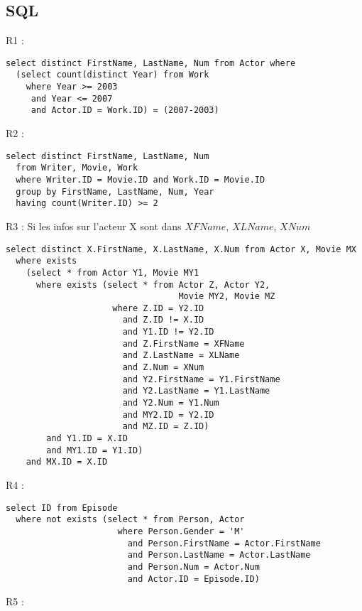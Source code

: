 \documentclass[a4paper,12pt]{article}
\begin{document}
\subsection{SQL}
\begin{list}{-}{}
  \item R1 :
    \begin{lstlisting}
select distinct FirstName, LastName, Num from Actor where
  (select count(distinct Year) from Work
    where Year >= 2003
     and Year <= 2007
     and Actor.ID = Work.ID) = (2007-2003)
    \end{lstlisting}
  \item R2 :
    \begin{lstlisting}
select distinct FirstName, LastName, Num
  from Writer, Movie, Work
  where Writer.ID = Movie.ID and Work.ID = Movie.ID
  group by FirstName, LastName, Num, Year
  having count(Writer.ID) >= 2
    \end{lstlisting}
  \item R3 :
    Si les infos sur l'acteur X sont dans $XFName$, $XLName$, $XNum$
    \begin{lstlisting}
select distinct X.FirstName, X.LastName, X.Num from Actor X, Movie MX
  where exists
    (select * from Actor Y1, Movie MY1
      where exists (select * from Actor Z, Actor Y2,
                                  Movie MY2, Movie MZ
                     where Z.ID = Y2.ID
                       and Z.ID != X.ID
                       and Y1.ID != Y2.ID
                       and Z.FirstName = XFName
                       and Z.LastName = XLName
                       and Z.Num = XNum
                       and Y2.FirstName = Y1.FirstName
                       and Y2.LastName = Y1.LastName
                       and Y2.Num = Y1.Num
                       and MY2.ID = Y2.ID
                       and MZ.ID = Z.ID)
        and Y1.ID = X.ID
        and MY1.ID = Y1.ID)
    and MX.ID = X.ID
    \end{lstlisting}
  \item R4 :
    \begin{lstlisting}
select ID from Episode
  where not exists (select * from Person, Actor
                      where Person.Gender = 'M'
                        and Person.FirstName = Actor.FirstName
                        and Person.LastName = Actor.LastName
                        and Person.Num = Actor.Num
                        and Actor.ID = Episode.ID)
    \end{lstlisting}
  \item R5 :
    \begin{lstlisting}

\end{lstlisting}
\end{list}
\end{document}
